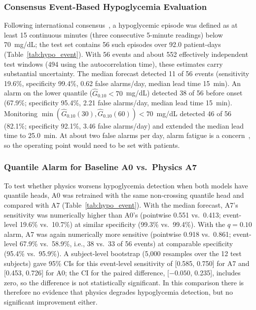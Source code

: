 \documentclass[journal]{IEEEtran}
\begin{document}
\subsubsection{Consensus Event-Based Hypoglycemia Evaluation}
Following international consensus~\cite{ref52}, a hypoglycemic episode was defined as at least 15 continuous minutes (three consecutive 5-minute readings) below 70~mg/dL; the test set contains 56 such episodes over 92.0 patient-days (Table~\ref{tab:hypo_event}). With 56 events and about 552 effectively independent test windows (494 using the autocorrelation time), these estimates carry substantial uncertainty. The median forecast detected 11 of 56 events (sensitivity 19.6\%, specificity 99.4\%, 0.62 false alarms/day, median lead time 15~min). An alarm on the lower quantile ($\hat{G}_{0.10} < 70$~mg/dL) detected 38 of 56 before onset (67.9\%; specificity 95.4\%, 2.21 false alarms/day, median lead time 15~min). Monitoring $\min(\hat{G}_{0.10}(30), \hat{G}_{0.10}(60)) < 70$~mg/dL detected 46 of 56 (82.1\%; specificity 92.1\%, 3.46 false alarms/day) and extended the median lead time to 25.0~min. At about two false alarms per day, alarm fatigue is a concern~\cite{refShivers}, so the operating point would need to be set with patients.

\subsubsection{Quantile Alarm for Baseline A0 vs.\ Physics A7}
\label{sec:quantile_a0_a7}
To test whether physics worsens hypoglycemia detection when both models have quantile heads, A0 was retrained with the same non-crossing quantile head and compared with A7 (Table~\ref{tab:hypo_event}). With the median forecast, A7's sensitivity was numerically higher than A0's (pointwise 0.551 vs.\ 0.413; event-level 19.6\% vs.\ 10.7\%) at similar specificity (99.3\% vs.\ 99.4\%). With the $q = 0.10$ alarm, A7 was again numerically more sensitive (pointwise 0.918 vs.\ 0.861; event-level 67.9\% vs.\ 58.9\%, i.e., 38 vs.\ 33 of 56 events) at comparable specificity (95.4\% vs.\ 95.9\%). A subject-level bootstrap (5,000 resamples over the 12 test subjects) gave 95\% CIs for this event-level sensitivity of [0.585, 0.750] for A7 and [0.453, 0.726] for A0; the CI for the paired difference, [$-0.050$, 0.235], includes zero, so the difference is not statistically significant. In this comparison there is therefore no evidence that physics degrades hypoglycemia detection, but no significant improvement either.
\end{document}
